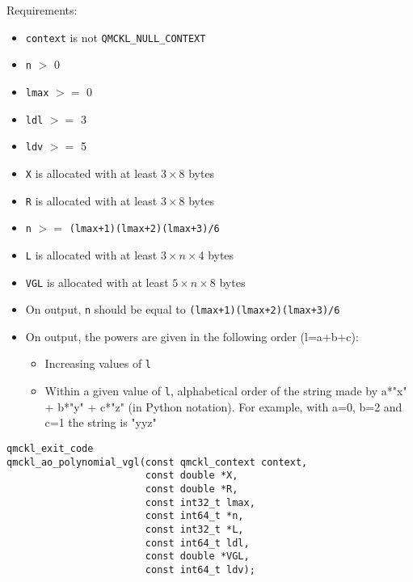 Requirements:

\begin{itemize}
\item \texttt{context} is not \texttt{QMCKL\_NULL\_CONTEXT}
\item \texttt{n} $>$ 0
\item \texttt{lmax} $>=$ 0
\item \texttt{ldl} $>=$ 3
\item \texttt{ldv} $>=$ 5
\item \texttt{X} is allocated with at least \(3 \times 8\) bytes
\item \texttt{R} is allocated with at least \(3 \times 8\) bytes
\item \texttt{n} $>=$ \texttt{(lmax+1)(lmax+2)(lmax+3)/6}
\item \texttt{L} is allocated with at least \(3 \times n \times 4\) bytes
\item \texttt{VGL} is allocated with at least \(5 \times n \times 8\) bytes
\item On output, \texttt{n} should be equal to \texttt{(lmax+1)(lmax+2)(lmax+3)/6}
\item On output, the powers are given in the following order (l=a+b+c):
\begin{itemize}
\item Increasing values of \texttt{l}
\item Within a given value of \texttt{l}, alphabetical order of the
string made by a*"x" + b*"y" + c*"z" (in Python notation).
For example, with a=0, b=2 and c=1 the string is "yyz"
\end{itemize}
\end{itemize}

\begin{verbatim}
qmckl_exit_code
qmckl_ao_polynomial_vgl(const qmckl_context context,
                        const double *X,
                        const double *R,
                        const int32_t lmax,
                        const int64_t *n,
                        const int32_t *L,
                        const int64_t ldl,
                        const double *VGL,
                        const int64_t ldv);
\end{verbatim}

